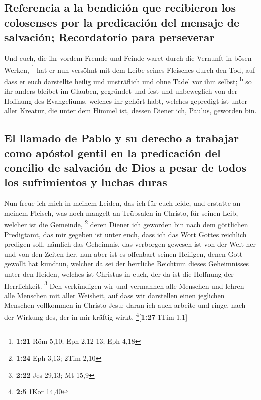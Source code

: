 \hypertarget{referencia-a-la-bendiciuxf3n-que-recibieron-los-colosenses-por-la-predicaciuxf3n-del-mensaje-de-salvaciuxf3n-recordatorio-para-perseverar}{%
\subsection{Referencia a la bendición que recibieron los colosenses por
la predicación del mensaje de salvación; Recordatorio para
perseverar}\label{referencia-a-la-bendiciuxf3n-que-recibieron-los-colosenses-por-la-predicaciuxf3n-del-mensaje-de-salvaciuxf3n-recordatorio-para-perseverar}}

 Und euch, die ihr vordem Fremde und Feinde waret durch
die Vernunft in bösen Werken, \footnote{\textbf{1:21} Röm 5,10; Eph
  2,12-13; Eph 4,18}  hat er nun versöhnt mit dem Leibe
seines Fleisches durch den Tod, auf dass er euch darstellte heilig und
unsträflich und ohne Tadel vor ihm selbst; \textsuperscript{b}
 so ihr anders bleibet im Glauben, gegründet und fest und
unbeweglich von der Hoffnung des Evangeliums, welches ihr gehört habt,
welches gepredigt ist unter aller Kreatur, die unter dem Himmel ist,
dessen Diener ich, Paulus, geworden bin.

\hypertarget{el-llamado-de-pablo-y-su-derecho-a-trabajar-como-apuxf3stol-gentil-en-la-predicaciuxf3n-del-concilio-de-salvaciuxf3n-de-dios-a-pesar-de-todos-los-sufrimientos-y-luchas-duras}{%
\subsection{El llamado de Pablo y su derecho a trabajar como apóstol
gentil en la predicación del concilio de salvación de Dios a pesar de
todos los sufrimientos y luchas
duras}\label{el-llamado-de-pablo-y-su-derecho-a-trabajar-como-apuxf3stol-gentil-en-la-predicaciuxf3n-del-concilio-de-salvaciuxf3n-de-dios-a-pesar-de-todos-los-sufrimientos-y-luchas-duras}}

 Nun freue ich mich in meinem Leiden, das ich für euch
leide, und erstatte an meinem Fleisch, was noch mangelt an Trübsalen in
Christo, für seinen Leib, welcher ist die Gemeinde, \footnote{\textbf{1:24}
  Eph 3,13; 2Tim 2,10}  deren Diener ich geworden bin
nach dem göttlichen Predigtamt, das mir gegeben ist unter euch, dass ich
das Wort Gottes reichlich predigen soll,  nämlich das
Geheimnis, das verborgen gewesen ist von der Welt her und von den Zeiten
her, nun aber ist es offenbart seinen Heiligen,  denen
Gott gewollt hat kundtun, welcher da sei der herrliche Reichtum dieses
Geheimnisses unter den Heiden, welches ist Christus in euch, der da ist
die Hoffnung der Herrlichkeit. \footnote{\textbf{2:22} Jes 29,13; Mt
  15,9}  Den verkündigen wir und vermahnen alle Menschen
und lehren alle Menschen mit aller Weisheit, auf dass wir darstellen
einen jeglichen Menschen vollkommen in Christo Jesu; 
daran ich auch arbeite und ringe, nach der Wirkung des, der in mir
kräftig wirkt. \footnote{\textbf{2:5} 1Kor 14,40}{[}\textbf{1:27} 1Tim
1,1{]}

